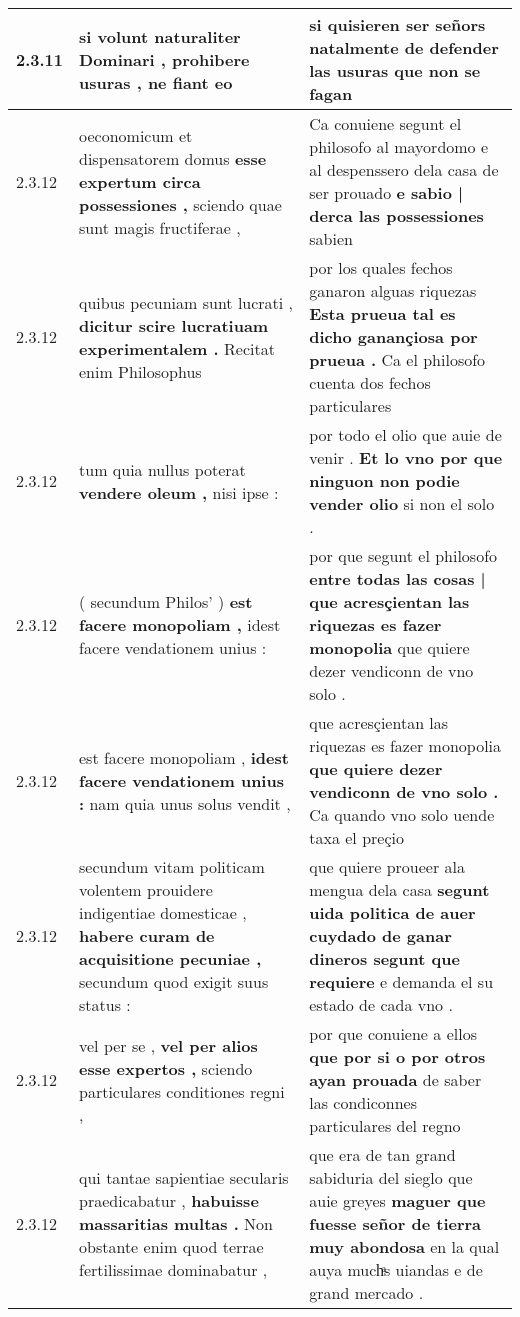 \begin{tabular}{|p{1cm}|p{6.5cm}|p{6.5cm}|}
2.3.11 & si volunt naturaliter Dominari , \textbf{ prohibere usuras , } ne fiant eo & si quisieren ser señors natalmente \textbf{ de defender las usuras } que non se fagan \\\hline
2.3.12 & oeconomicum et dispensatorem domus \textbf{ esse expertum circa possessiones , } sciendo quae sunt magis fructiferae , & Ca conuiene segunt el philosofo al mayordomo e al despenssero dela casa de ser prouado \textbf{ e sabio | derca las possessiones } sabien \\\hline
2.3.12 & quibus pecuniam sunt lucrati , \textbf{ dicitur scire lucratiuam experimentalem . } Recitat enim Philosophus & por los quales fechos ganaron alguas riquezas \textbf{ Esta prueua tal es dicho ganançiosa por prueua . } Ca el philosofo cuenta dos fechos particulares \\\hline
2.3.12 & tum quia nullus poterat \textbf{ vendere oleum , } nisi ipse : & por todo el olio que auie de venir . \textbf{ Et lo vno por que ninguon non podie vender olio } si non el solo . \\\hline
2.3.12 & ( secundum Philos’ ) \textbf{ est facere monopoliam , } idest facere vendationem unius : & por que segunt el philosofo \textbf{ entre todas las cosas | que acresçientan las riquezas es fazer monopolia } que quiere dezer vendiconn de vno solo . \\\hline
2.3.12 & est facere monopoliam , \textbf{ idest facere vendationem unius : } nam quia unus solus vendit , & que acresçientan las riquezas es fazer monopolia \textbf{ que quiere dezer vendiconn de vno solo . } Ca quando vno solo uende taxa el preçio \\\hline
2.3.12 & secundum vitam politicam volentem prouidere indigentiae domesticae , \textbf{ habere curam de acquisitione pecuniae , } secundum quod exigit suus status : & que quiere proueer ala mengua dela casa \textbf{ segunt uida politica de auer cuydado de ganar dineros segunt que requiere } e demanda el su estado de cada vno . \\\hline
2.3.12 & vel per se , \textbf{ vel per alios esse expertos , } sciendo particulares conditiones regni , & por que conuiene a ellos \textbf{ que por si o por otros ayan prouada } de saber las condiconnes particulares del regno \\\hline
2.3.12 & qui tantae sapientiae secularis praedicabatur , \textbf{ habuisse massaritias multas . } Non obstante enim quod terrae fertilissimae dominabatur , & que era de tan grand sabiduria del sieglo que auie greyes \textbf{ maguer que fuesse señor de tierra muy abondosa } en la qual auya muchͣs uiandas e de grand mercado . \\\hline

\end{tabular}

